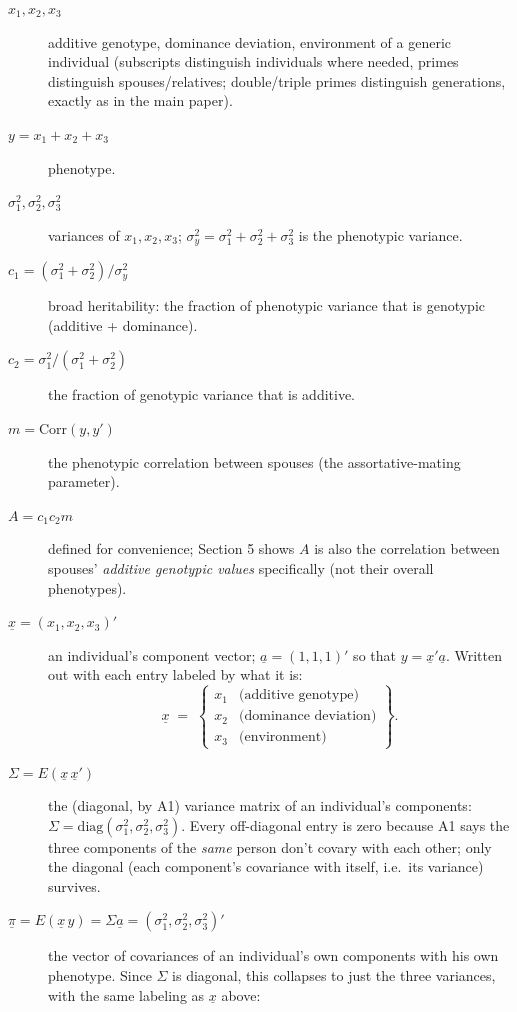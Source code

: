 \documentclass[12pt]{article}
\begin{document}
\begin{description}
\item[$x_1,x_2,x_3$] additive genotype, dominance deviation, environment of a generic individual (subscripts distinguish individuals where needed, primes distinguish spouses/relatives; double/triple primes distinguish generations, exactly as in the main paper).
\item[$y=x_1+x_2+x_3$] phenotype.
\item[$\sigma_1^2,\sigma_2^2,\sigma_3^2$] variances of $x_1,x_2,x_3$; $\sigma_y^2=\sigma_1^2+\sigma_2^2+\sigma_3^2$ is the phenotypic variance.
\item[$c_1=(\sigma_1^2+\sigma_2^2)/\sigma_y^2$] broad heritability: the fraction of phenotypic variance that is genotypic (additive + dominance).
\item[$c_2=\sigma_1^2/(\sigma_1^2+\sigma_2^2)$] the fraction of genotypic variance that is additive.
\item[$m=\mathrm{Corr}(y,y')$] the phenotypic correlation between spouses (the assortative-mating parameter).
\item[$A=c_1c_2m$] defined for convenience; Section 5 shows $A$ is also the correlation between spouses' \emph{additive genotypic values} specifically (not their overall phenotypes).
\item[$\underline x=(x_1,x_2,x_3)'$] an individual's component vector; $\underline a=(1,1,1)'$ so that $y=\underline x'\underline a$. Written out with each entry labeled by what it is:
\begin{equation*}
\underline x \;=\;
\left\{\begin{array}{ll}
x_1 & \text{(additive genotype)} \\
x_2 & \text{(dominance deviation)} \\
x_3 & \text{(environment)}
\end{array}\right\} .
\end{equation*}
\item[$\Sigma=E(\underline x\,\underline x')$] the (diagonal, by A1) variance matrix of an individual's components: $\Sigma=\mathrm{diag}(\sigma_1^2,\sigma_2^2,\sigma_3^2)$. Every off-diagonal entry is zero because A1 says the three components of the \emph{same} person don't covary with each other; only the diagonal (each component's covariance with itself, i.e.\ its variance) survives.
\item[$\underline\pi=E(\underline x\,y)=\Sigma\underline a=(\sigma_1^2,\sigma_2^2,\sigma_3^2)'$] the vector of covariances of an individual's own components with his own phenotype. Since $\Sigma$ is diagonal, this collapses to just the three variances, with the same labeling as $\underline x$ above:

\end{description}
\end{document}
